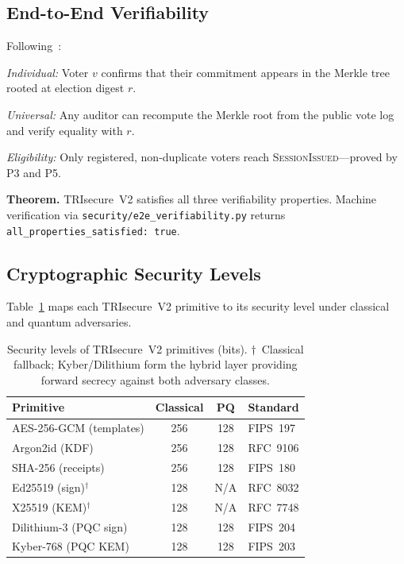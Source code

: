 \documentclass[submission]{sacjsub}
\begin{document}
\subsection{End-to-End Verifiability}\label{sec:e2e}

Following~\cite{kusters2010accountability,benaloh2011e2e}:

\textit{Individual:} Voter \(v\) confirms that their commitment appears
in the Merkle tree rooted at election digest \(r\).

\textit{Universal:} Any auditor can recompute the Merkle root from the
public vote log and verify equality with \(r\).

\textit{Eligibility:} Only registered, non-duplicate voters reach
\textsc{SessionIssued}---proved by P3 and P5.

\textbf{Theorem.} TRIsecure~V2 satisfies all three verifiability
properties. Machine verification via
\texttt{security/e2e\_verifiability.py} returns
\texttt{all\_properties\_satisfied: true}.

\subsection{Cryptographic Security Levels}

Table~\ref{tab:security_levels} maps each TRIsecure~V2 primitive to
its security level under classical and quantum adversaries.

\begin{table}[t]
\caption{Security levels of TRIsecure~V2 primitives (bits).
  $\dagger$~Classical fallback; Kyber/Dilithium form the hybrid layer
  providing forward secrecy against both adversary classes.}
\label{tab:security_levels}
\begin{tabular}{|l|c|c|l|}
  \hline
  Primitive & Classical & PQ & Standard \\
  \hline
  AES-256-GCM (templates) & 256 & 128 & FIPS~197 \\
  Argon2id (KDF)          & 256 & 128 & RFC~9106 \\
  SHA-256 (receipts)      & 256 & 128 & FIPS~180 \\
  Ed25519 (sign)$^\dagger$& 128 & N/A & RFC~8032 \\
  X25519 (KEM)$^\dagger$  & 128 & N/A & RFC~7748 \\
  Dilithium-3 (PQC sign)  & 128 & 128 & FIPS~204 \\
  Kyber-768 (PQC KEM)     & 128 & 128 & FIPS~203 \\
  \hline
\end{tabular}
\end{table}
\end{document}
